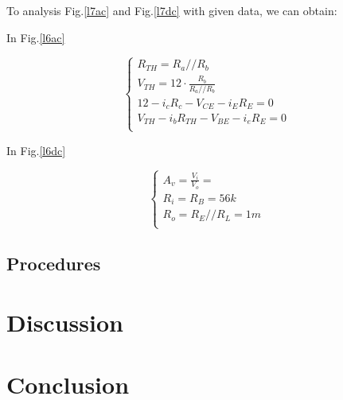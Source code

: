    \FloatBarrier
    To analysis Fig.\ref{l7ac} and Fig.\ref{l7dc} with given data, we can obtain:\par
    In Fig.\ref{l6ac}\par
    \begin{equation}
        \begin{cases}
            R_{TH} = R_a//R_b\\
            V_{TH} = 12\cdot\frac{R_b}{R_a//R_b}\\
            12-i_cR_c-V_{CE}-i_ER_E=0\\
            V_{TH}-i_bR_{TH}-V_{BE}-i_eR_E=0\\
        \end{cases}
    \end{equation}
    
    In Fig.\ref{l6dc}\par
    \begin{equation}
        \begin{cases}
            A_v = \frac{V_i}{V_o} = \\
            R_i = R_B = 56k\\
            R_o = R_E//R_L = 1m\\
        \end{cases}
    \label{l6eq1}
    \end{equation}
    
    
    \subsection{Procedures}

    
\section{Discussion}


\section{Conclusion}
